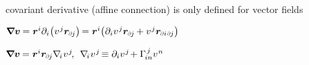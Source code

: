 \begin{otherlanguage}{russian}
covariant derivative (affine connection) is only defined for vector fields

${
\boldnabla \bm{v} \hspace{-0.15ex}
= \locationvector^{i} \partial_i \hspace{-0.33ex} \left( v^{\hspace{.12ex}j} \locationvector_\differentialindex{\hspace{-0.1ex}j} \right) \hspace{-0.25ex}
= \locationvector^{i} \hspace{-0.4ex} \left( \partial_i v^{\hspace{.12ex}j} \locationvector_\differentialindex{\hspace{-0.1ex}j} \hspace{-0.12ex} + v^{\hspace{.12ex}j} \locationvector_{\differentialindex{i}\hspace{.2ex}\differentialindex{\hspace{-0.1ex}j}} \right)
}$

${
\boldnabla \bm{v} \hspace{-0.15ex}
= \locationvector^{i} \locationvector_\differentialindex{\hspace{-0.1ex}j} \nabla_{\hspace{-0.32ex}i\hspace{.1ex}} v^{\hspace{.12ex}j} \hspace{-0.3ex} , \:\:
\nabla_{\hspace{-0.32ex}i\hspace{.1ex}} v^{\hspace{.12ex}j} \hspace{-0.3ex} \equiv
\partial_i v^{\hspace{.12ex}j} \hspace{-0.33ex} + \Gamma_{\hspace{-0.25ex}in}^{\hspace{.25ex}j} v^{\hspace{.1ex}n}
}$


\end{otherlanguage}
